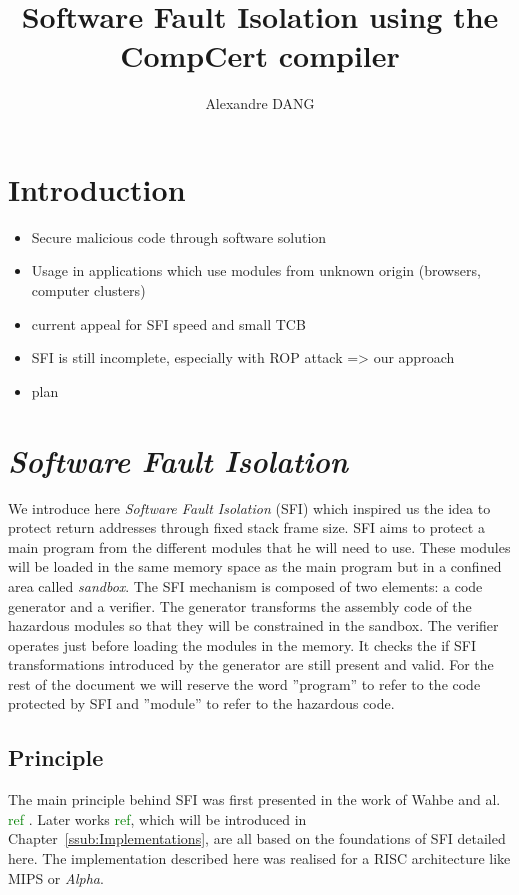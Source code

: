 \documentclass[11pt]{sdm}
\title{Software Fault Isolation using the CompCert compiler}
\author{Alexandre \textsc{DANG}}
\begin{document}
\maketitle


\section{Introduction}


\begin{itemize}
	\item Secure malicious code through software solution
	\item Usage in applications which use modules from unknown origin (browsers, computer clusters)
	\item current appeal for SFI speed and small TCB
	\item SFI is still incomplete, especially with ROP attack => our approach
	\item  plan
\end{itemize}


\newpage
\section{\textit{Software Fault Isolation}}
\label{sec:sfi}

	We introduce here \textit{Software Fault Isolation} (SFI) which inspired us the idea to protect return addresses through fixed stack frame size. SFI aims to protect a main program from the different modules that he will need to use. These modules will be loaded in the same memory space as the main program but in a confined area called \textit{sandbox}. The SFI mechanism is composed of two elements: a code generator and a verifier. The generator transforms the assembly code of the hazardous modules so that they will be constrained in the sandbox. The verifier operates just before loading the modules in the memory. It checks the if SFI transformations introduced by the generator are still present and valid. For the rest of the document we will reserve the word ''program'' to refer to the code protected by SFI and ''module'' to refer to the hazardous code.

\subsection{Principle}

The main principle behind SFI was first presented in the work of Wahbe and al. \textcolor{green}{ref}
. Later works \textcolor{green}{ref}, which will be introduced in Chapter~\ref{ssub:Implementations}, are all based on the foundations of SFI detailed here.
The implementation described here was realised for a RISC architecture like MIPS or \textit{Alpha}.
\end{document}
